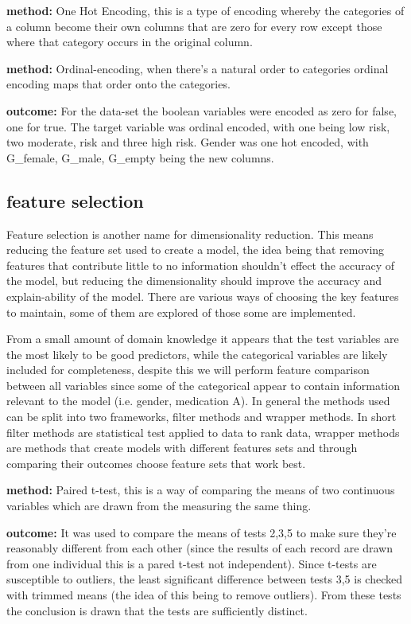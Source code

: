 \documentclass[a4paper]{article}
\begin{document}
\textbf{method:} One Hot Encoding, this is a type of encoding whereby the categories of a column become their own columns that are zero for every row except those where that category occurs in the original column.

\textbf{method:} Ordinal-encoding, when there's a natural order to categories ordinal encoding maps that order onto the categories.

\textbf{outcome:} For the data-set the boolean variables were encoded as zero for false, one for true. The target variable was ordinal encoded, with one being low risk, two moderate, risk and three high risk. Gender was one hot encoded, with G\_female, G\_male, G\_empty being the new columns.

\subsection{feature selection} \label{tests}
Feature selection is another name for dimensionality reduction. This means reducing the feature set used to create a model, the idea being that removing features that contribute little to no information shouldn't effect the accuracy of the model, but reducing the dimensionality should improve the accuracy and explain-ability of the model. There are various ways of choosing the key features to maintain, some of them are explored of those some are implemented.

From a small amount of domain knowledge it appears that the test variables are the most likely to be good predictors, while the categorical variables are likely included for completeness, despite this we will perform feature comparison between all variables since some of the categorical appear to contain information relevant to the model (i.e. gender, medication A). In general the methods used can be split into two frameworks, filter methods and wrapper methods. In short filter methods are statistical test applied to data to rank data, wrapper methods are methods that create models with different features sets and through comparing their outcomes choose feature sets that work best.

\textbf{method:} Paired t-test, this is a way of comparing the means of two continuous variables which are drawn from the measuring the same thing. 

\textbf{outcome:} It was used to compare the means of tests 2,3,5 to make sure they're reasonably different from each other (since the results of each record are drawn from one individual this is a pared t-test not independent). Since t-tests are susceptible to outliers, the least significant difference between tests 3,5 is checked with trimmed means (the idea of this being to remove outliers). From these tests the conclusion is drawn that the tests are sufficiently distinct.
\end{document}
